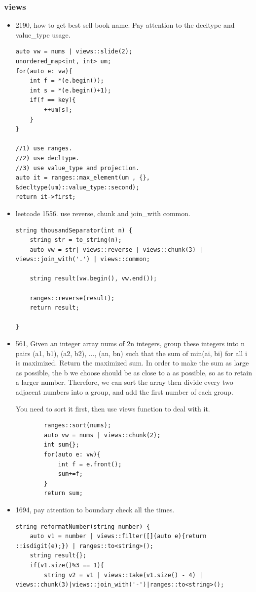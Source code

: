 \documentclass[a4paper,11pt,twoside]{book}
\begin{document}
\subsubsection{views}
\begin{itemize}
			
	\item 2190, how to get best sell book name. Pay attention to the decltype and value\_type usage. 
	
\begin{lstlisting}
auto vw = nums | views::slide(2);
unordered_map<int, int> um;
for(auto e: vw){
	int f = *(e.begin());
	int s = *(e.begin()+1);
	if(f == key){
		++um[s];
	}
}

//1) use ranges.
//2) use decltype.
//3) use value_type and projection.
auto it = ranges::max_element(um , {}, &decltype(um)::value_type::second);
return it->first;	
\end{lstlisting}	
	

	
		\item leetcode 1556. use reverse, chunk and join\_with common.
\begin{lstlisting}
string thousandSeparator(int n) {
	string str = to_string(n);
	auto vw = str| views::reverse | views::chunk(3) | views::join_with('.') | views::common;
	
	string result(vw.begin(), vw.end());
	
	ranges::reverse(result);
	return result;
	
}
\end{lstlisting}
	
		\item 561,  Given an integer array nums of 2n integers, group these integers into n pairs (a1, b1), (a2, b2), ..., (an, bn) such that the sum of min(ai, bi) for all i is maximized. Return the maximized sum. In order to make the sum as large as possible, the b we choose should be as close to a as possible, so as to retain a larger number. Therefore, we can sort the array then divide every two adjacent numbers into a group, and add the first number of each group.
	
	You need to sort it first, then use views function to deal with it.
	\begin{lstlisting}
		ranges::sort(nums);
		auto vw = nums | views::chunk(2);
		int sum{};
		for(auto e: vw){
			int f = e.front();
			sum+=f;
		}
		return sum;
	\end{lstlisting}
	
	\item 1694,  pay attention to boundary check all the times. 
\begin{lstlisting}
string reformatNumber(string number) {
	auto v1 = number | views::filter([](auto e){return ::isdigit(e);}) | ranges::to<string>();
	string result{};    
	if(v1.size()%3 == 1){
		string v2 = v1 | views::take(v1.size() - 4) | views::chunk(3)|views::join_with('-')|ranges::to<string>();
		

\end{lstlisting}
\end{itemize}
\end{document}
